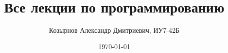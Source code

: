 

\title{Все лекции по программированию}
\author{Козырнов Александр Дмитриевич, ИУ7-42Б}
\date{\today}


